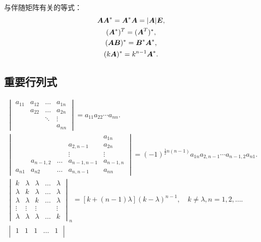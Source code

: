 与伴随矩阵有关的等式：
\begin{gather*}
	\vb{A} \vb{A}^* = \vb{A}^* \vb{A} = \abs{\vb{A}} \vb{E}, \\ %
	(\vb{A}^*)^T = (\vb{A}^T)^*, \\ %
	(\vb{A} \vb{B})^* = \vb{B}^* \vb{A}^*, \\ %
	(k \vb{A})^* = k^{n-1} \vb{A}^*. %
\end{gather*}

\subsection*{重要行列式}
\begin{gather*}
	\begin{vmatrix}
		a_{11} & a_{12} & \dots & a_{1n} \\
		& a_{22} & \dots & a_{2n} \\
		& & \ddots & \vdots \\
		& & & a_{nn}
	\end{vmatrix}
	= a_{11} a_{22} \dotsm a_{nn}. \\%
	\begin{vmatrix}
		& & & & a_{1n} \\
		& & & a_{2,n-1} & a_{2n} \\
		& & & \vdots & \vdots \\
		& a_{n-1,2} & \dots & a_{n-1,n-1} & a_{n-1,n} \\
		a_{n1} & a_{n2} & \dots & a_{n,n-1} & a_{nn}
	\end{vmatrix}
	=(-1)^{\frac{1}{2}n(n-1)} a_{1n} a_{2,n-1} \dotsm a_{n-1,2} a_{n1}. \\
	\begin{vmatrix}
		k & \lambda & \lambda & \dots & \lambda \\
		\lambda & k & \lambda & \dots & \lambda \\
		\lambda & \lambda & k & \dots & \lambda \\
		\vdots & \vdots & \vdots & & \vdots \\
		\lambda & \lambda & \lambda & \dots & k
	\end{vmatrix}_n
	= [k+(n-1)\lambda] (k-\lambda)^{n-1},
	\quad k\neq\lambda,n=1,2,\dotsc. \\
	\begin{vmatrix}
		1 & 1 & 1 & \dots & 1 \\

\end{vmatrix}
\end{gather*}
